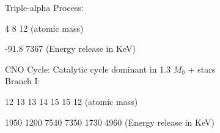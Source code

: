  \vspace{1cm}
 
 
 Triple-alpha Process:\\
 
 \begin{center}
 \end{center}
 
 \vspace{-2mm}
 
 \hspace{6.6cm} {\scriptsize 4 \hspace{0.8cm} 8 \hspace{0.8cm} 12 \hfill (atomic mass) \\
 	\vspace{-2mm}
 	
 	\hspace{6.9cm} -91.8 \hspace{0.4cm}  7367 \hfill (Energy release in KeV)}
 
 \vspace{1cm}
 
 
 \vspace{1cm}
 
 CNO Cycle: Catalytic cycle dominant in 1.3 $M_0$ + stars\\
 
 \hspace{3 cm} Branch I: \\	
 \begin{center}
 \end{center}
 \vspace{-2mm}
 \hspace{4.7cm} {\scriptsize 12 \hspace{0.6cm} 13 \hspace{0.9cm} 13 \hspace{0.6cm} 14 \hspace{0.7cm} 15 \hspace{0.9cm} 15 \hspace{0.7cm} 12 \hfill (atomic mass) \\
 	\vspace{-2mm}
 	
 	\hspace{4.6cm} 1950 \hspace{0.4cm}  1200 \hspace{0.5cm}  7540 \hspace{0.4cm}  7350 \hspace{0.5cm}  1730 \hspace{0.5cm} 4960 \hfill (Energy release in KeV)}
 

